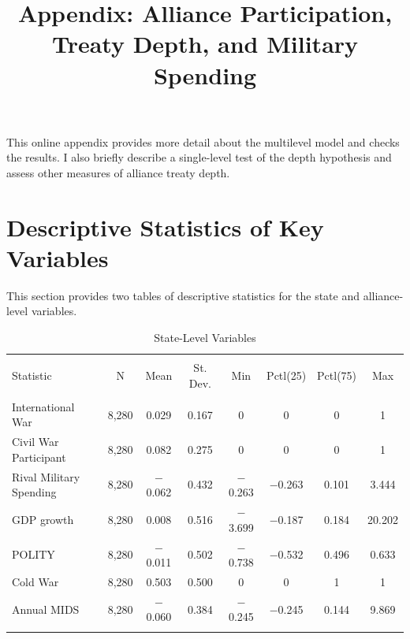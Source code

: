 \documentclass[12pt]{article}
\title{\textbf{Appendix: Alliance Participation, Treaty Depth, and Military Spending}}
\date{}
\begin{document}
\maketitle 

\doublespace 

This online appendix provides more detail about the multilevel model and checks the results. I also briefly describe a single-level test of the depth hypothesis and assess other measures of alliance treaty depth. 


\section{Descriptive Statistics of Key Variables} 

This section provides two tables of descriptive statistics for the state and alliance-level variables. 



\begin{table}[!htbp] \centering 
  \caption{State-Level Variables} 
  \label{tab:state-level-sum} 
\begin{tabular}{@{\extracolsep{5pt}}lccccccc} 
\\[-1.8ex]\hline 
\hline \\[-1.8ex] 
Statistic & \multicolumn{1}{c}{N} & \multicolumn{1}{c}{Mean} & \multicolumn{1}{c}{St. Dev.} & \multicolumn{1}{c}{Min} & \multicolumn{1}{c}{Pctl(25)} & \multicolumn{1}{c}{Pctl(75)} & \multicolumn{1}{c}{Max} \\ 
\hline \\[-1.8ex] 
International War & 8,280 & 0.029 & 0.167 & 0 & 0 & 0 & 1 \\ 
Civil War Participant & 8,280 & 0.082 & 0.275 & 0 & 0 & 0 & 1 \\ 
Rival Military Spending & 8,280 & $-$0.062 & 0.432 & $-$0.263 & $-$0.263 & 0.101 & 3.444 \\ 
GDP growth & 8,280 & 0.008 & 0.516 & $-$3.699 & $-$0.187 & 0.184 & 20.202 \\ 
POLITY & 8,280 & $-$0.011 & 0.502 & $-$0.738 & $-$0.532 & 0.496 & 0.633 \\ 
Cold War & 8,280 & 0.503 & 0.500 & 0 & 0 & 1 & 1 \\ 
Annual MIDS & 8,280 & $-$0.060 & 0.384 & $-$0.245 & $-$0.245 & 0.144 & 9.869 \\ 
\hline \\[-1.8ex] 
\end{tabular} 
\end{table} 
\end{document}
